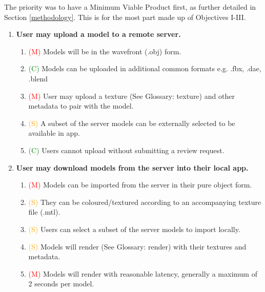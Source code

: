 \documentclass[12pt, a4paper]{article}
\newcommand{\must}[1]{\textcolor{red}{#1}}
\newcommand{\should}[1]{\textcolor{orange}{#1}}
\newcommand{\could}[1]{\textcolor{green}{#1}}
\begin{document}
The priority was to have a Minimum Viable Product first, as further detailed in Section \ref{methodology}. This is for the most part made up of Objectives I-III.

\begin{enumerate}[label=\Roman*.]
\item \textbf{User may upload a model to a remote server.}
    \begin{enumerate}[label=\arabic*.]
    \item \must{(M)} Models will be in the wavefront (.obj) form.
    \item \could{(C)} Models can be uploaded in additional common formats e.g. .fbx, .dae, .blend
    \item \must{(M)} User may upload a texture (See Glossary: \gls{texture}) and other metadata to pair with the model.
    \item \should{(S)} A subset of the server models can be externally selected to be available in app.
    \item \could{(C)} Users cannot upload without submitting a review request.
    \end{enumerate}
    
\item \textbf{User may download models from the server into their local app.}
    \begin{enumerate}[label=\arabic*.]
    \item \must{(M)} Models can be imported from the server in their pure object form.
    \item \should{(S)} They can be coloured/textured according to an accompanying texture file (.mtl).
    \item \should{(S)} Users can select a subset of the server models to import locally.
    \item \should{(S)} Models will render (See Glossary: \gls{render}) with their textures and metadata.
    \item \must{(M)} Models will render with reasonable latency, generally a maximum of 2 seconds per model.
    \end{enumerate}


\end{enumerate}
\end{document}
